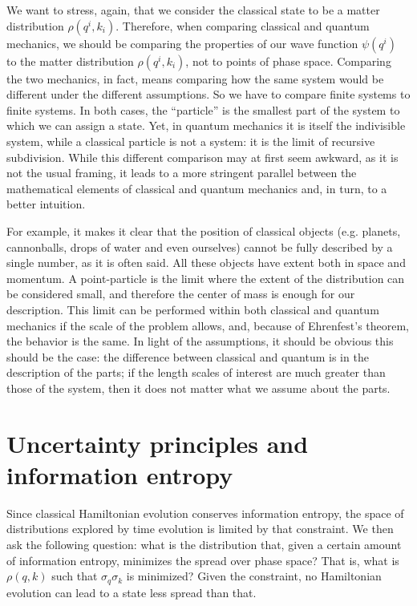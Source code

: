 \documentclass{article}
\begin{document}
We want to stress, again, that we consider the classical state to be a matter distribution $\rho(q^i, k_i)$. Therefore, when comparing classical and quantum mechanics, we should be comparing the properties of our wave function $\psi(q^i)$ to the matter distribution $\rho(q^i, k_i)$, not to points of phase space. Comparing the two mechanics, in fact, means comparing how the same system would be different under the different assumptions. So we have to compare finite systems to finite systems. In both cases, the ``particle'' is the smallest part of the system to which we can assign a state. Yet, in quantum mechanics it is itself the indivisible system, while a classical particle is not a system: it is the limit of recursive subdivision.  While this different comparison may at first seem awkward, as it is not the usual framing, it leads to a more stringent parallel between the mathematical elements of classical and quantum mechanics and, in turn, to a better intuition. 

For example, it makes it clear that the position of classical objects (e.g. planets, cannonballs, drops of water and even ourselves) cannot be fully described by a single number, as it is often said. All these objects have extent both in space and momentum. A point-particle is the limit where the extent of the distribution can be considered small, and therefore the center of mass is enough for our description. This limit can be performed within both classical and quantum mechanics if the scale of the problem allows, and, because of Ehrenfest's theorem, the behavior is the same. In light of the assumptions, it should be obvious this should be the case: the difference between classical and quantum is in the description of the parts; if the length scales of interest are much greater than those of the system, then it does not matter what we assume about the parts.

\section{Uncertainty principles and information entropy}

Since classical Hamiltonian evolution conserves information entropy, the space of distributions explored by time evolution is limited by that constraint. We then ask the following question: what is the distribution that, given a certain amount of information entropy, minimizes the spread over phase space? That is, what is $\rho(q, k)$ such that $\sigma_q\sigma_k$ is minimized? Given the constraint, no Hamiltonian evolution can lead to a state less spread than that.
\end{document}
